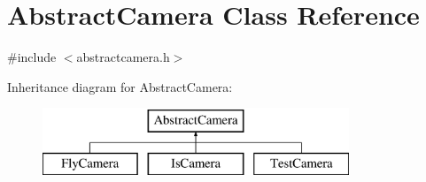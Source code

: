 \hypertarget{class_abstract_camera}{\section{Abstract\-Camera Class Reference}
\label{class_abstract_camera}
}


{\ttfamily \#include $<$abstractcamera.\-h$>$}

Inheritance diagram for Abstract\-Camera\-:\begin{figure}[H]
\begin{center}
\leavevmode
\includegraphics[height=2.000000cm]{class_abstract_camera}
\end{center}
\end{figure}
